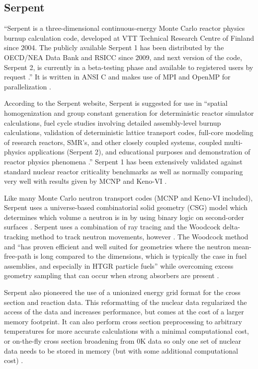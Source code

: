 \subsection{Serpent}

``Serpent is a three-dimensional continuous-energy Monte Carlo reactor physics burnup calculation code, developed at VTT Technical Research Centre of Finland since 2004. The publicly available Serpent 1 has been distributed by the OECD/NEA Data Bank and RSICC since 2009, and next version of the code, Serpent 2, is currently in a beta-testing phase and available to registered users by request \cite{serpent}.''  It is written in ANSI C and makes use of MPI and OpenMP for parallelization \cite{jaakko}.

 According to the Serpent website, Serpent is suggested for use in ``spatial homogenization and group constant generation for deterministic reactor simulator calculations, fuel cycle studies involving detailed assembly-level burnup calculations, validation of deterministic lattice transport codes, full-core modeling of research reactors, SMR's, and other closely coupled systems, coupled multi-physics applications (Serpent 2),  and educational purposes and demonstration of reactor physics phenomena \cite{serpent}.''  Serpent 1 has been extensively validated against standard nuclear reactor criticality benchmarks as well as normally comparing very well with results given by MCNP and Keno-VI \cite{serpent}.

Like many Monte Carlo neutron transport codes (MCNP and Keno-VI included), Serpent uses a universe-based combinatorial solid geometry (CSG) model which determines which volume a neutron is in by using binary logic on second-order surfaces \cite{mcnp, serpent}.  Serpent uses a combination of ray tracing and the Woodcock delta-tracking method to track neutron movements, however \cite{serpent}.  The Woodcock method and ``has proven efficient and well suited for geometries where the neutron mean-free-path is long compared to the dimensions, which is typically the case in fuel assemblies, and especially in HTGR particle fuels'' while overcoming excess geometry sampling that can occur when strong absorbers are present \cite{serpent}.

Serpent also pioneered the use of a unionized energy grid format for the cross section and reaction data.  This reformatting of the nuclear data regularized the access of the data and increases performance, but comes at the cost of a larger memory footprint.  It can also perform cross section preprocessing to arbitrary temperatures for more accurate calculations with a minimal computational cost, or on-the-fly cross section broadening from 0K data so only one set of nuclear data needs to be stored in memory (but with some additional computational cost) \cite{serpent}.

